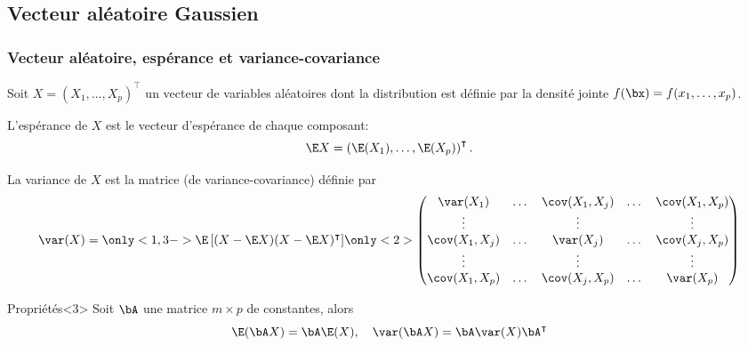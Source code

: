 \documentclass{beamer}\usepackage[]{graphicx}\usepackage[]{color}
\begin{document}
\subsection{Vecteur aléatoire Gaussien}

\begin{frame}
  \frametitle{Vecteur aléatoire, espérance et  variance-covariance}

  Soit $X = (X_1,\dots,X_p)^\intercal$ un vecteur de variables aléatoires dont la distribution est définie par la densité jointe $f(\bx) = f(x_1,\dots,x_p)$.
  
\begin{definitionf}[Espérance]
L'espérance de $X$ est le vecteur d'espérance de chaque composant:
\begin{equation*}
\E X  = \left(\E(X_1), \dots, \E(X_p) \right)^\intercal.
\end{equation*}
\end{definitionf}

\vspace{-.35cm} 

\begin{definitionf}[Variance]
  La variance de $X$ est la matrice (de variance-covariance) définie par
  \begin{equation*}
\var(X) = \only<1,3->{\E\left[(X - \E X) (X - \E X)^\intercal \right]}  
\only<2>{\begin{pmatrix}
\var (X_1) & \dots & \cov(X_1,X_j ) & \dots & \cov(X_1,X_p) \\
 \vdots &  & \vdots & & \vdots \\
\cov(X_1,X_j) & \dots & \var(X_j ) & \dots & \cov(X_j,X_p) \\
 \vdots &  & \vdots & & \vdots \\
\cov (X_1,X_p) & \dots & \cov(X_j,X_p ) & \dots & \var(X_p) \\
\end{pmatrix}}
\end{equation*}
\end{definitionf}

\vspace{-.35cm}

\begin{block}{Propriétés}<3>
Soit $\bA$ une matrice $m \times p$ de constantes, alors
\begin{equation*}
\E (\bA X) = \bA \E(X), \quad \var(\bA X) = \bA \var(X) \bA^\intercal
\end{equation*}
\end{block}
\end{frame}
\end{document}

